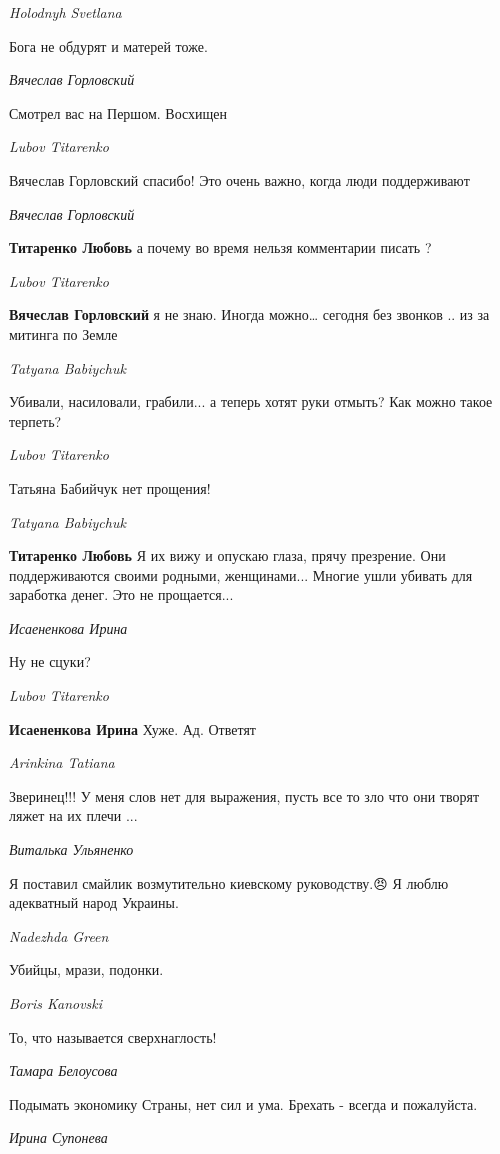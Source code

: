 \emph{Holodnyh Svetlana}

Бога не обдурят и матерей тоже.

\emph{Вячеслав Горловский}

Смотрел вас на Першом. Восхищен

\emph{Lubov Titarenko}

Вячеслав Горловский спасибо! Это очень важно, когда люди поддерживают

\emph{Вячеслав Горловский}

\textbf{Титаренко Любовь} а почему во время нельзя комментарии писать ?

\emph{Lubov Titarenko}

\textbf{Вячеслав Горловский} я не знаю. Иногда можно… сегодня без звонков .. из
за митинга по Земле

\emph{Tatyana Babiychuk}

Убивали, насиловали, грабили... а теперь хотят руки отмыть? Как можно такое терпеть?

\emph{Lubov Titarenko}

Татьяна Бабийчук нет прощения!

\emph{Tatyana Babiychuk}

\textbf{Титаренко Любовь} Я их вижу и опускаю глаза, прячу презрение. Они
поддерживаются своими родными, женщинами... Многие ушли убивать для заработка
денег. Это не прощается...

\emph{Исаененкова Ирина}

Ну не сцуки?

\emph{Lubov Titarenko}

\textbf{Исаененкова Ирина} Хуже. Ад. Ответят

\emph{Arinkina Tatiana}

Зверинец!!! У меня слов нет для выражения, пусть все то зло что они творят ляжет на их плечи ...

\emph{Виталька Ульяненко}

Я поставил смайлик возмутительно киевскому руководству.😠 Я люблю адекватный
народ Украины.

\emph{Nadezhda Green}

Убийцы, мрази, подонки.

\emph{Boris Kanovski}

То, что называется сверхнаглость!

\emph{Тамара Белоусова}

Подымать экономику Страны, нет сил и ума. Брехать - всегда и пожалуйста.

\emph{Ирина Супонева}

